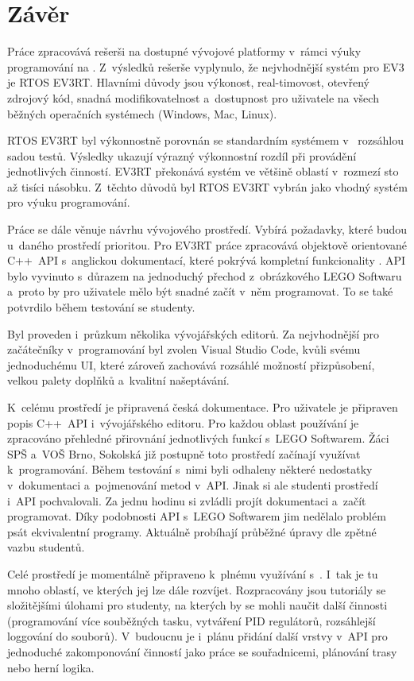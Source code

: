 \chapter{Závěr}

Práce zpracovává rešerši na dostupné vývojové platformy v~rámci výuky programování na \legoEV{}.
Z~výsledků rešerše vyplynulo, že nejvhodnější systém pro EV3 je RTOS EV3RT. 
Hlavními důvody jsou výkonost, real-timovost, otevřený zdrojový kód, snadná modifikovatelnost a~dostupnost pro uživatele na všech běžných operačních systémech (Windows, Mac, Linux).

RTOS EV3RT byl výkonnostně porovnán se standardním systémem v~ rozsáhlou sadou testů.
Výsledky ukazují výrazný výkonnostní rozdíl při provádění jednotlivých činností. 
EV3RT překonává \lego{} systém ve většině oblastí v~rozmezí sto až tisíci násobku.
Z~těchto důvodů byl RTOS EV3RT vybrán jako vhodný systém pro výuku programování. 

Práce se dále věnuje návrhu vývojového prostředí. 
Vybírá požadavky, které budou u~daného prostředí prioritou.
Pro EV3RT práce zpracovává objektově orientované C++~API s~anglickou dokumentací, které pokrývá kompletní funkcionality \legoEV{}. 
API bylo vyvinuto s~důrazem na jednoduchý přechod z~obrázkového LEGO Softwaru a~proto by pro uživatele mělo být snadné začít v~něm programovat.
To se také potvrdilo během testování se studenty.

Byl proveden i~průzkum několika vývojářských editorů. 
Za nejvhodnější pro začátečníky v~programování byl zvolen Visual Studio Code, kvůli svému jednoduchému UI, které zároveň zachovává rozsáhlé možností přizpůsobení, velkou palety doplňků a~kvalitní našeptávání. 

K~celému prostředí je připravená česká dokumentace. 
Pro uživatele je připraven popis C++~API i~vývojářského editoru. 
Pro každou oblast používání je zpracováno přehledné přirovnání jednotlivých funkcí s~LEGO Softwarem.
Žáci SPŠ a~VOŠ Brno, Sokolská již postupně toto prostředí začínají využívat k~programování.
Během testování s~nimi byli odhaleny některé nedostatky v~dokumentaci a~pojmenování metod v~API. 
Jinak si ale studenti prostředí i~API pochvalovali. 
Za jednu hodinu si zvládli projít dokumentaci a~začít programovat. 
Díky podobnosti API s~LEGO Softwarem jim nedělalo problém psát ekvivalentní programy.
Aktuálně probíhají průběžné úpravy dle zpětné vazbu studentů.

Celé prostředí je momentálně připraveno k~plnému využívání s~\legoEV{}. 
I~tak je tu mnoho oblastí, ve kterých jej lze dále rozvíjet. 
Rozpracovány jsou tutoriály se složitějšími úlohami pro studenty, na kterých by se mohli naučit další činnosti (programování více souběžných tasku, vytváření PID regulátorů, rozsáhlejší loggování do souborů).
V~budoucnu je i~plánu přidání další vrstvy v~API pro jednoduché zakomponování činností jako práce se souřadnicemi, plánování trasy nebo herní logika.

